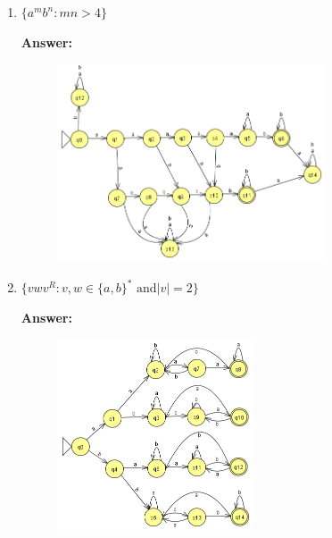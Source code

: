 \documentclass[12pt]{article}
\begin{document}
\begin{spacing}{1.5}
\begin{enumerate}
\begin{enumerate}
			            \newpage

			      \item $\{a^mb^n : mn > 4\}$

			            \noindent \textbf{Answer:}

			            \begin{figure}[h!]
				            \centering
				            \includegraphics[width=0.75\textwidth]{img/q3/q3_e.png}
			            \end{figure}

			      \item $\{vwv^R : v,w \in \{a,b \}^* \text{ and} |v| = 2 \}$

			            \noindent \textbf{Answer:}

			            \begin{figure}[h!]
				            \centering
				            \includegraphics[width=0.55\textwidth]{img/q3/q3_f.png}
			            \end{figure}
		      \end{enumerate}

	\end{enumerate}

\end{spacing}
\end{document}

